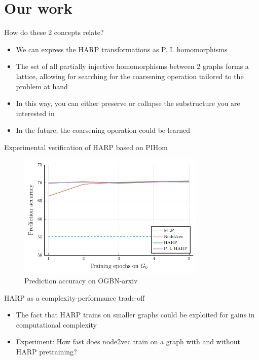 \documentclass[10pt]{beamer}
\begin{document}
\section{Our work}

\begin{frame}{How do these 2 concepts relate?}
	\begin{itemize}
		\item We can express the HARP transformations as P. I. homomorphisms
		\item The set of all partially injective homomorphisms between 2 graphs forms a lattice, allowing for searching for the coarsening operation tailored to the problem at hand
		\item In this way, you can either preserve or collapse the substructure you are interested in
		\item In the future, the coarsening operation could be learned
	\end{itemize}
\end{frame}

\begin{frame}{Experimental verification of HARP based on PIHom}
	\begin{figure}
		\centering
		\includegraphics[width=0.8\textwidth]{images/pihom_comparison/pihom_comparison.pdf}
		\caption{Prediction accuracy on OGBN-arxiv}
	\end{figure}
\end{frame}

\begin{frame}{HARP as a complexity-performance trade-off}
	\begin{itemize}
		\item The fact that HARP trains on smaller graphs could be exploited for gains in computational complexity
		\item Experiment: How fast does node2vec train on a graph with and without HARP pretraining?
	\end{itemize}
\end{frame}
\end{document}
